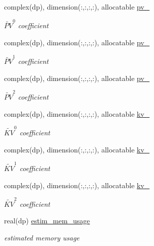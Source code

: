 \begin{DoxyCompactItemize}
complex(dp), dimension(\+:,\+:,\+:,\+:), allocatable \hyperlink{structx__vars_1_1x__2__type_a5b7c4fa433fe46dabc806a7fbb1832dc}{pv\+\_}
\begin{DoxyCompactList}\small\item\em $\widetilde{PV}^0$ coefficient \end{DoxyCompactList}\item 
complex(dp), dimension(\+:,\+:,\+:,\+:), allocatable \hyperlink{structx__vars_1_1x__2__type_a53910430e36de0ca91359322bdcf1e86}{pv\+\_}
\begin{DoxyCompactList}\small\item\em $\widetilde{PV}^1$ coefficient \end{DoxyCompactList}\item 
complex(dp), dimension(\+:,\+:,\+:,\+:), allocatable \hyperlink{structx__vars_1_1x__2__type_a02ca37a3af02f70acbc536d20a70bd0e}{pv\+\_}
\begin{DoxyCompactList}\small\item\em $\widetilde{PV}^2$ coefficient \end{DoxyCompactList}\item 
complex(dp), dimension(\+:,\+:,\+:,\+:), allocatable \hyperlink{structx__vars_1_1x__2__type_ae7427dad704bb989266d32d97e5d0235}{kv\+\_}
\begin{DoxyCompactList}\small\item\em $\widetilde{KV}^0$ coefficient \end{DoxyCompactList}\item 
complex(dp), dimension(\+:,\+:,\+:,\+:), allocatable \hyperlink{structx__vars_1_1x__2__type_a0cad62f1816e668211135c7097916123}{kv\+\_}
\begin{DoxyCompactList}\small\item\em $\widetilde{KV}^1$ coefficient \end{DoxyCompactList}\item 
complex(dp), dimension(\+:,\+:,\+:,\+:), allocatable \hyperlink{structx__vars_1_1x__2__type_a7861681a8170e07ce68ae6d29af2f3d3}{kv\+\_}
\begin{DoxyCompactList}\small\item\em $\widetilde{KV}^2$ coefficient \end{DoxyCompactList}\item 
real(dp) \hyperlink{structx__vars_1_1x__2__type_ada4dee48cd358adb447688c11170d3b4}{estim\+\_\+mem\+\_\+usage}
\begin{DoxyCompactList}\small\item\em estimated memory usage \end{DoxyCompactList}\end{DoxyCompactItemize}


